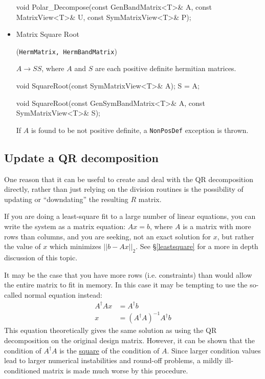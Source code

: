 \documentclass[twoside,letterpaper,11pt]{article}
\renewcommand{\tt}[1]{{\lstinline {#1}}}
\begin{document}
\begin{itemize}
\begin{tmvcode}
void Polar_Decompose(const GenBandMatrix<T>& A,
      const MatrixView<T>& U, const SymMatrixView<T>& P);
\end{tmvcode}

\item Matrix Square Root 

(\tt{HermMatrix, HermBandMatrix})

$A \rightarrow S S$, where $A$ and $S$ are each positive definite hermitian matrices.

\begin{tmvcode}
void SquareRoot(const SymMatrixView<T>& A);
S = A;

void SquareRoot(const GenSymBandMatrix<T>& A, 
      const SymMatrixView<T>& S);
\end{tmvcode}

If $A$ is found to be not positive definite, a \tt{NonPosDef} exception is thrown.

\end{itemize}

\subsection{Update a QR decomposition}

One reason that it can be useful to create and deal with the QR decomposition directly,
rather than 
just relying on the division routines is the possibility
of updating or ``downdating'' the resulting $R$ matrix.  

If you are doing a 
least-square fit to a large number of linear equations, you can write the system as
a matrix equation: 
$A x = b$, where $A$ is a matrix with more rows than columns, and you are seeking,
not an exact solution for $x$, but rather the value of $x$ which minimizes
$||b-Ax||_2$.  See \S\ref{leastsquare} for a more in depth discussion of this topic.

It may be the case that you
have more rows (i.e. constraints) than would allow the entire matrix to fit in memory.  
In this case it may be tempting to use the so-called normal equation instead: 
\begin{align*}
A^\dagger A x &= A^\dagger b \\
x & = (A^\dagger A)^{-1} A^\dagger b
\end{align*}
This equation theoretically gives the same 
solution as using the QR decomposition on the original design matrix.
However, it can be shown that the condition of $A^\dagger A$ is the 
\underline{square} of the condition of $A$.  Since larger condition values
lead to larger numerical instabilities and round-off problems, a mildly
ill-conditioned matrix is made much worse by this procedure.
\end{document}
